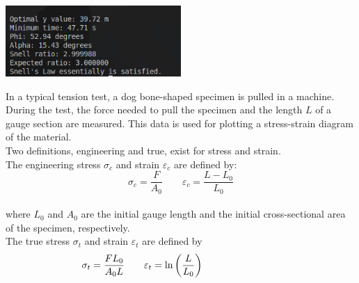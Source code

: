 \documentclass[a4paper, 12pt]{report}
\def\ni{blue!20!white}
\def\link{blue!50!black}
\begin{document}
    
    \includegraphics[width=0.5\textwidth]{images/q7.png}

    \newpage
    \begin{tcolorbox}[title={\color{black}{\section{Q8}}}, colback=white, colframe=\ni, boxrule=1mm, width=1\textwidth]    
    In a typical tension test, a dog bone-shaped specimen is pulled in a machine. During the test, the force needed to pull the specimen and the length \( L \) of a gauge section are measured. This data is used for plotting a stress-strain diagram of the material.\\[8pt]
    Two definitions, engineering and true, exist for stress and strain.\\
    The engineering stress \( \sigma_c \) and strain \( \varepsilon_c \) are defined by:\\[0em]
    \[\sigma_c = \frac{F}{A_0} \qquad \varepsilon_c = \frac{L - L_0}{L_0}\]\\[0em]
    where \( L_0 \) and \( A_0 \) are the initial gauge length and the initial cross-sectional area of the specimen, respectively.\\[8pt]
    The true stress \( \sigma_t \) and strain \( \varepsilon_t \) are defined by\\[1em]
    \[\hspace{-8em} \sigma_t = \frac{F L_0}{A_0 L} \qquad \varepsilon_t = \ln\left(\frac{L}{L_0}\right)\]\\
    

\end{tcolorbox}
\end{document}
